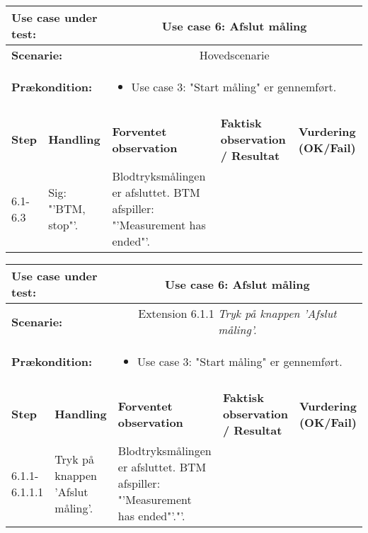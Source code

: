 \begin{tabular}{|p{1cm}|p{3cm}|p{4cm}|p{4cm}|p{2cm}|}
\hline
\multicolumn{2}{|p{3cm}|}{\textbf{Use case under test:}} & \multicolumn{3}{c|}{Use case 6: Afslut måling} \\\hline

\multicolumn{2}{|p{3cm}|}{\textbf{Scenarie:}} & \multicolumn{3}{c|}{Hovedscenarie} \\\hline

\multicolumn{2}{|p{3cm}|}{\textbf{Prækondition:}}  & \multicolumn{3}{l|}{\parbox{0.6\textwidth}{
\begin{itemize}[label=$\circ$]
\item Use case 3: "Start måling" er gennemført.  
\end{itemize} }}\\\hline

\multicolumn{5}{|c|}{} \\\hline

\textbf{Step} & \textbf{Handling} & \textbf{Forventet observation} & \textbf{Faktisk observation / Resultat} & \textbf{Vurdering (OK/Fail)}\\\hline

6.1-6.3 & Sig: "'BTM, stop"'. & Blodtryksmålingen er afsluttet. BTM afspiller: "'Measurement has ended"'. &  & \\\hline

\end{tabular}




\begin{tabular}{|p{1cm}|p{3cm}|p{4cm}|p{4cm}|p{2cm}|}
\hline
\multicolumn{2}{|p{3cm}|}{\textbf{Use case under test:}} & \multicolumn{3}{c|}{Use case 6: Afslut måling} \\\hline

\multicolumn{2}{|p{3cm}|}{\textbf{Scenarie:}} & \multicolumn{3}{c|}{Extension 6.1.1 \textit{Tryk på knappen 'Afslut måling'.}} \\\hline

\multicolumn{2}{|p{3cm}|}{\textbf{Prækondition:}}  & \multicolumn{3}{l|}{\parbox{0.6\textwidth}{
\begin{itemize}[label=$\circ$]
\item Use case 3: "Start måling" er gennemført.
\end{itemize} }}\\\hline

\multicolumn{5}{|c|}{} \\\hline

\textbf{Step} & \textbf{Handling} & \textbf{Forventet observation} & \textbf{Faktisk observation / Resultat} & \textbf{Vurdering (OK/Fail)}\\\hline

6.1.1-6.1.1.1 & Tryk på knappen 'Afslut måling'. & Blodtryksmålingen er afsluttet. BTM afspiller: "'Measurement has ended"'."'. & & \\\hline

\end{tabular}

